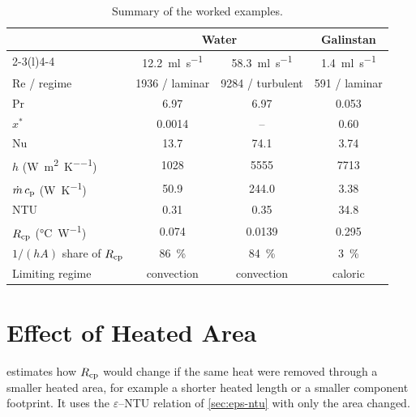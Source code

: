 \begin{table}[htbp]
  \centering
  \caption{Summary of the worked examples.}
  \label{tab:app-examples}
  \small
  \setlength{\tabcolsep}{5pt}
  \begin{tabular}{@{}lccc@{}}
    \toprule
    & \multicolumn{2}{c}{Water} & Galinstan \\
    \cmidrule(lr){2-3}\cmidrule(l){4-4}
    & \SI{12.2}{\milli\litre\per\second} & \SI{58.3}{\milli\litre\per\second}
      & \SI{1.4}{\milli\litre\per\second} \\
    \midrule
    Re / regime & 1936 / laminar & 9284 / turbulent & 591 / laminar \\
    Pr & 6.97 & 6.97 & 0.053 \\
    $x^*$ & 0.0014 & -- & 0.60 \\
    Nu & 13.7 & 74.1 & 3.74 \\
    $h$ (\si{\watt\per\metre\squared\per\kelvin}) & 1028 & 5555 & 7713 \\
    $\dot{m}\,c_{\mathrm{p}}$ (\si{\watt\per\kelvin}) & 50.9 & 244.0 & 3.38 \\
    NTU & 0.31 & 0.35 & 34.8 \\
    $R_{\mathrm{cp}}$ (\si{\celsius\per\watt}) & 0.074 & 0.0139 & 0.295 \\
    $1/(hA)$ share of $R_{\mathrm{cp}}$ & \SI{86}{\percent} & \SI{84}{\percent} & \SI{3}{\percent} \\
    Limiting regime & convection & convection & caloric \\
    \bottomrule
  \end{tabular}
\end{table}

\section{Effect of Heated Area}
\label{app:area-scaling}

 estimates how $R_{\mathrm{cp}}$ would change if the same heat
were removed through a smaller heated area, for example a shorter heated length
or a smaller component footprint. It uses the $\varepsilon$--NTU relation of
\cref{sec:eps-ntu} with only the area changed.

